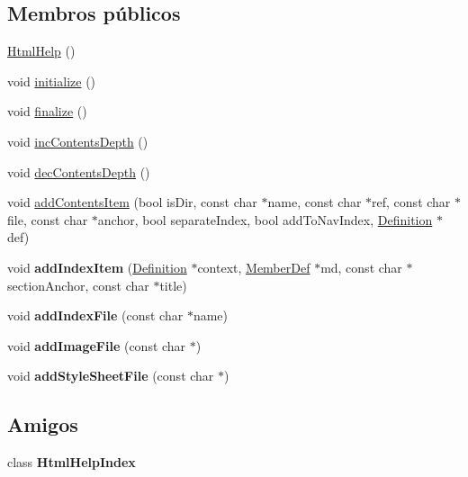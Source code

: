 \subsection*{Membros públicos}
\begin{DoxyCompactItemize}
\item 
\hyperlink{class_html_help_af779198851136d1f58cc241632b410f7}{Html\-Help} ()
\item 
void \hyperlink{class_html_help_a25a40b6614565f755233080a384c35f1}{initialize} ()
\item 
void \hyperlink{class_html_help_a32d626626eee0bc4ade146973f6abb1c}{finalize} ()
\item 
void \hyperlink{class_html_help_a96772b5eeae8044b3308f63fb040c253}{inc\-Contents\-Depth} ()
\item 
void \hyperlink{class_html_help_a3a6a2629dd91105d0048f0d0a9f7f983}{dec\-Contents\-Depth} ()
\item 
void \hyperlink{class_html_help_a2037325cd2bf36b4a134b87dbb107a94}{add\-Contents\-Item} (bool is\-Dir, const char $\ast$name, const char $\ast$ref, const char $\ast$file, const char $\ast$anchor, bool separate\-Index, bool add\-To\-Nav\-Index, \hyperlink{class_definition}{Definition} $\ast$def)
\item 
\hypertarget{class_html_help_acae96bcfb2681e31a0e64854dd3809fe}{void {\bfseries add\-Index\-Item} (\hyperlink{class_definition}{Definition} $\ast$context, \hyperlink{class_member_def}{Member\-Def} $\ast$md, const char $\ast$section\-Anchor, const char $\ast$title)}\label{class_html_help_acae96bcfb2681e31a0e64854dd3809fe}

\item 
\hypertarget{class_html_help_a8e569c4ea40f30de2accf0a87b7d8d30}{void {\bfseries add\-Index\-File} (const char $\ast$name)}\label{class_html_help_a8e569c4ea40f30de2accf0a87b7d8d30}

\item 
\hypertarget{class_html_help_ae96a05963365ea76e95ac32a7cce3fb2}{void {\bfseries add\-Image\-File} (const char $\ast$)}\label{class_html_help_ae96a05963365ea76e95ac32a7cce3fb2}

\item 
\hypertarget{class_html_help_a373a41a11f6707488992a715912f6f06}{void {\bfseries add\-Style\-Sheet\-File} (const char $\ast$)}\label{class_html_help_a373a41a11f6707488992a715912f6f06}

\end{DoxyCompactItemize}
\subsection*{Amigos}
\begin{DoxyCompactItemize}
\item 
\hypertarget{class_html_help_a6ba39d6a831c897c93a68738d9a721f3}{class {\bfseries Html\-Help\-Index}}\label{class_html_help_a6ba39d6a831c897c93a68738d9a721f3}

\end{DoxyCompactItemize}


